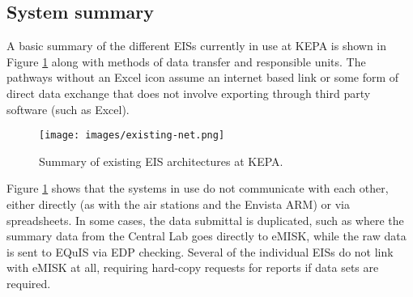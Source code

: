 \subsection{System summary}
A basic summary of the different EISs currently in use at KEPA is shown in Figure \ref{fig:existing} along with methods of data transfer and responsible units. The pathways without an Excel icon assume an internet based link or some form of direct data exchange that does not involve exporting through third party software (such as Excel).

%
\begin{figure}[H]
\centering
\texttt{[image: images/existing-net.png]} 
\caption{Summary of existing EIS architectures at KEPA.}
\label{fig:existing}
\end{figure}
%

Figure \ref{fig:existing} shows that the systems in use do not communicate with each other, either directly (as with the air stations and the Envista ARM) or via spreadsheets. In some cases, the data submittal is duplicated, such as where the summary data from the Central Lab goes directly to eMISK, while the raw data is sent to EQuIS via EDP checking. Several of the individual EISs do not link with eMISK at all, requiring hard-copy requests for reports if data sets are required.